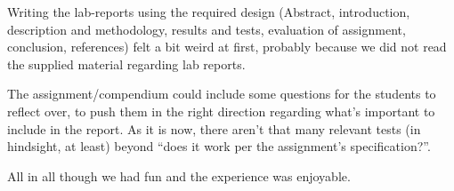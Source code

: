 Writing the lab-reports using the required design (Abstract, introduction, description and methodology, results and tests, evaluation of assignment, conclusion, references) felt a bit weird at first, probably because we did not read the supplied material regarding lab reports.

The assignment/compendium could include some questions for the students to reflect over, to push them in the right direction regarding what's important to include in the report.
As it is now, there aren't that many relevant tests (in hindsight, at least) beyond ``does it work per the assignment's specification?''.

All in all though we had fun and the experience was enjoyable.